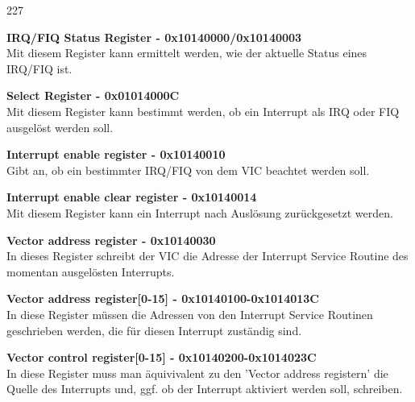 \begin{dinglist}{227}
	\item{\textbf{IRQ/FIQ Status Register - 0x10140000/0x10140003}}\\
	Mit diesem Register kann ermittelt werden, wie der aktuelle Status eines IRQ/FIQ ist.
	\item{\textbf{Select Register - 0x01014000C}} \\
	Mit diesem Register kann bestimmt werden, ob ein Interrupt als IRQ oder FIQ ausgel\"ost werden soll.
	\item{\textbf{Interrupt enable register - 0x10140010}} \\
	Gibt an, ob ein bestimmter IRQ/FIQ von dem VIC beachtet werden soll.
	\item{\textbf{Interrupt enable clear register - 0x10140014}}\\
	Mit diesem Register kann ein Interrupt nach Ausl\"osung zur\"uckgesetzt werden.
	\item{\textbf{Vector address register - 0x10140030}}\\
	In dieses Register schreibt der VIC die Adresse der Interrupt Service Routine des momentan ausgel\"osten Interrupts.
	\item{\textbf{Vector address register[0-15] - 0x10140100-0x1014013C}}\\
	In diese Register m\"ussen die Adressen von den Interrupt Service Routinen geschrieben werden, die f\"ur diesen Interrupt zust\"andig sind.
	\item{\textbf{Vector control register[0-15] - 0x10140200-0x1014023C}}\\
	In diese Register muss man \"aquivivalent zu den 'Vector address registern' die Quelle des Interrupts und, ggf. ob der Interrupt aktiviert werden soll, schreiben.
\end{dinglist}